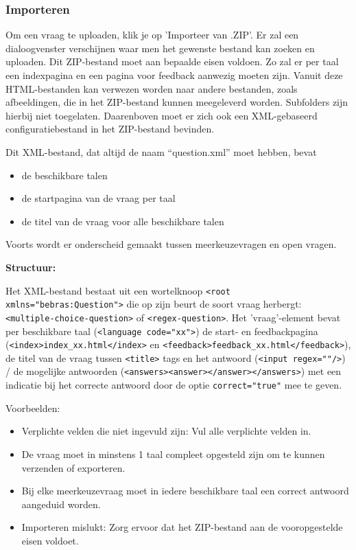 \documentclass[]{article}
\begin{document}
\subsubsection{Importeren}
Om een vraag te uploaden, klik je op 'Importeer van .ZIP'. Er zal een dialoogvenster verschijnen waar men het gewenste bestand kan zoeken en uploaden. Dit ZIP-bestand moet aan bepaalde eisen voldoen. Zo zal er per taal een indexpagina en een pagina voor feedback aanwezig moeten zijn. Vanuit deze HTML-bestanden kan verwezen worden naar andere bestanden, zoals afbeeldingen, die in het ZIP-bestand kunnen meegeleverd worden. Subfolders zijn hierbij niet toegelaten. Daarenboven moet er zich ook een XML-gebaseerd configuratiebestand in het ZIP-bestand bevinden. 

Dit XML-bestand, dat altijd de naam "`question.xml"' moet hebben, bevat
\begin{itemize}
\item de beschikbare talen
\item de startpagina van de vraag per taal
\item de titel van de vraag voor alle beschikbare talen
\end{itemize}

Voorts wordt er onderscheid gemaakt tussen meerkeuzevragen en open vragen.

\textbf{Structuur:}

Het XML-bestand bestaat uit een wortelknoop \verb+<root xmlns="bebras:Question">+ 
die op zijn beurt de soort vraag herbergt: \verb+<multiple-choice-question>+ of \verb+<regex-question>+.
Het 'vraag'-element bevat per beschikbare taal (\verb+<language code="xx">+) 
de start- en feedbackpagina (\verb+<index>index_xx.html</index>+ en \verb+<feedback>feedback_xx.html</feedback>+), 
de titel van de vraag tussen \verb+<title>+ tags 
en het antwoord (\verb+<input regex=""/>+) / de mogelijke antwoorden (\verb+<answers><answer></answer></answers>+)
met een indicatie bij het correcte antwoord door de optie \verb+correct="true"+ mee te geven.

Voorbeelden:

 

\begin{itemize}
\item Verplichte velden die niet ingevuld zijn: Vul alle verplichte velden in.
\item De vraag moet in minstens 1 taal compleet opgesteld zijn om te kunnen verzenden of exporteren.
\item Bij elke meerkeuzevraag moet in iedere beschikbare taal een correct antwoord aangeduid worden.
\item Importeren mislukt: Zorg ervoor dat het ZIP-bestand aan de vooropgestelde eisen voldoet.
\end{itemize}
\end{document}
